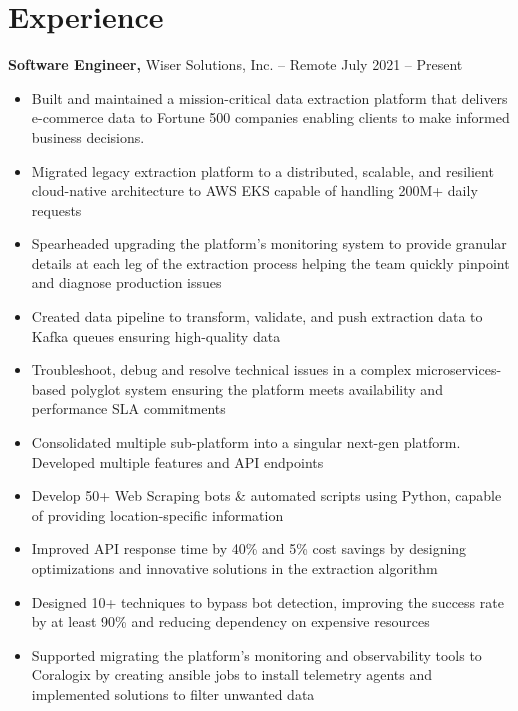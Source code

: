\documentclass[11pt]{article}       %
\begin{document}
\section*{Experience}
\textbf{Software Engineer,} {Wiser Solutions, Inc.} -- Remote \hfill July 2021 -- Present \\
\vspace{-9pt}
\begin{itemize}
  \item Built and maintained a mission-critical data extraction platform that delivers e-commerce data to Fortune 500 companies enabling clients to make informed business decisions. \\
  \item Migrated legacy extraction platform to a distributed, scalable, and resilient cloud-native architecture to AWS EKS capable of handling 200M+ daily requests \\
  \item Spearheaded upgrading the platform's monitoring system to provide granular details at each leg of the extraction process helping the team quickly pinpoint and diagnose production issues \\
  \item Created data pipeline to transform, validate, and push extraction data to Kafka queues ensuring high-quality data \\
  \item Troubleshoot, debug and resolve technical issues in a complex microservices-based polyglot system ensuring the platform meets availability and performance SLA commitments \\
  \item Consolidated multiple sub-platform into a singular next-gen platform. Developed multiple features and API endpoints \\
  \item Develop 50+ Web Scraping bots \& automated scripts using Python, capable of providing location-specific information \\
  \item Improved API response time by 40\% and 5\% cost savings by designing optimizations and innovative solutions in the extraction algorithm \\
  \item Designed 10+ techniques to bypass bot detection, improving the success rate by at least 90\% and reducing dependency on expensive resources \\
  \item Supported migrating the platform's monitoring and observability tools to Coralogix by creating ansible jobs to install telemetry agents and implemented solutions to filter unwanted data \\

\end{itemize}
\end{document}
